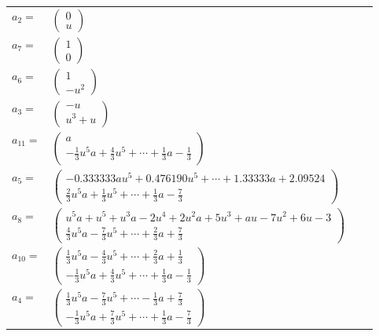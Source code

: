 \documentclass[1p]{elsarticle_modified}
\theoremstyle{definition}
\begin{document}
\begin{tabular}{m{7pt} m{180pt} m{7pt} m{180pt} }
\flushright $a_{2}=$&$\begin{pmatrix}0\\u\end{pmatrix}$ \\
\flushright $a_{7}=$&$\begin{pmatrix}1\\0\end{pmatrix}$ \\
\flushright $a_{6}=$&$\begin{pmatrix}1\\- u^2\end{pmatrix}$ \\
\flushright $a_{3}=$&$\begin{pmatrix}- u\\u^3+u\end{pmatrix}$ \\
\flushright $a_{11}=$&$\begin{pmatrix}a\\-\frac{1}{3} u^5 a+\frac{4}{3} u^5+\cdots+\frac{1}{3} a-\frac{1}{3}\end{pmatrix}$ \\
\flushright $a_{5}=$&$\begin{pmatrix}-0.333333 a u^{5}+0.476190 u^{5}+\cdots+1.33333 a+2.09524\\\frac{2}{3} u^5 a+\frac{1}{3} u^5+\cdots+\frac{1}{3} a-\frac{7}{3}\end{pmatrix}$ \\
\flushright $a_{8}=$&$\begin{pmatrix}u^5 a+u^5+u^3 a-2 u^4+2 u^2 a+5 u^3+a u-7 u^2+6 u-3\\\frac{4}{3} u^5 a-\frac{7}{3} u^5+\cdots+\frac{2}{3} a+\frac{7}{3}\end{pmatrix}$ \\
\flushright $a_{10}=$&$\begin{pmatrix}\frac{1}{3} u^5 a-\frac{4}{3} u^5+\cdots+\frac{2}{3} a+\frac{1}{3}\\-\frac{1}{3} u^5 a+\frac{4}{3} u^5+\cdots+\frac{1}{3} a-\frac{1}{3}\end{pmatrix}$ \\
\flushright $a_{4}=$&$\begin{pmatrix}\frac{1}{3} u^5 a-\frac{7}{3} u^5+\cdots-\frac{1}{3} a+\frac{7}{3}\\-\frac{1}{3} u^5 a+\frac{7}{3} u^5+\cdots+\frac{1}{3} a-\frac{7}{3}\end{pmatrix}$ \\

\end{tabular}
\end{document}
